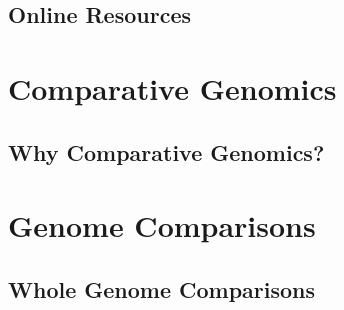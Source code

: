 \subsection{Online Resources}



\section{Comparative Genomics}

\subsection{Why Comparative Genomics?}



\section{Genome Comparisons}

\subsection{Whole Genome Comparisons}



%
%
%
%
%
%
%




